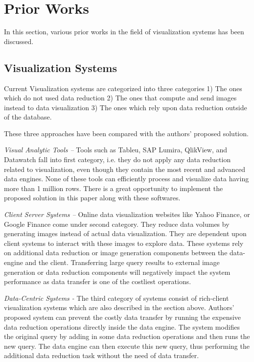 \section{Prior Works}
In this section, various prior works in the field of visualization systems has been discussed.

\subsection{Visualization Systems}
Current Visualization systems are categorized into three categories 1) The ones which do not used data reduction 2) The ones that compute and send images instead to data visualization 3) The ones which rely upon data reduction outside of the database.

These three approaches have been compared with the authors’ proposed solution.\newline


\textit{Visual Analytic Tools – }
Tools such as Tableu, SAP Lumira, QlikView, and Datawatch fall into first category, i.e. they do not apply any data reduction related to visualization, even though they contain the most recent and advanced data engines. None of these tools can efficiently process and visualize data having more than 1 million rows. There is a great opportunity to implement the proposed solution in this paper along with these softwares. \newline


\textit{Client Server Systems –  }
Online data visualization websites like Yahoo Finance, or Google Finance come under second category. They reduce data volumes by generating images instead of actual data visualization. They are dependent upon client systems to interact with these images to explore data. These systems rely on additional data reduction or image generation components between the data-engine and the client. Transferring large query results to external image generation or data reduction components will negatively impact the system performance as data transfer is one of the costliest operations. \newline



\textit{Data-Centric Systems -}
The third category of systems consist of rich-client visualization systems which are also described in the section above. Authors’ proposed system can prevent the costly data transfer by running the expensive data reduction operations directly inside the data engine. The system modifies the original query by adding in some data reduction operations and then runs the new query. The data engine can then execute this new query, thus performing the additional data reduction task without the need of data transfer.\newline


